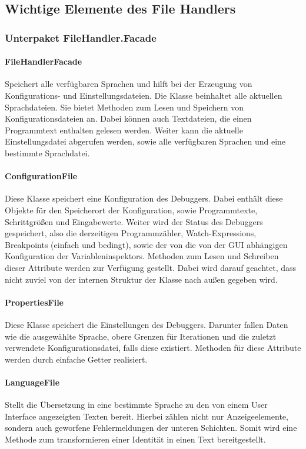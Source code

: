 \documentclass[parskip=full]{scrartcl}
\begin{document}
\subsection{Wichtige Elemente des File Handlers}
\subsubsection{Unterpaket FileHandler.Facade}
\paragraph{FileHandlerFacade}
Speichert alle verfügbaren Sprachen und hilft bei der Erzeugung von Konfigurations- und Einstellungsdateien.
Die Klasse beinhaltet alle aktuellen Sprachdateien.
Sie bietet Methoden zum Lesen und Speichern von Konfigurationsdateien an. Dabei können auch Textdateien, die einen Programmtext enthalten gelesen werden.
Weiter kann die aktuelle Einstellungsdatei abgerufen werden, sowie alle verfügbaren Sprachen und eine bestimmte Sprachdatei.
\paragraph{ConfigurationFile}
Diese Klasse speichert eine Konfiguration des Debuggers.
Dabei enthält diese Objekte für den Speicherort der Konfiguration, sowie Programmtexte, Schrittgrößen und Eingabewerte.
Weiter wird der Status des Debuggers gespeichert, also die derzeitigen Programmzähler, Watch-Expressions, Breakpoints (einfach und bedingt), sowie der von die von der GUI abhängigen Konfiguration der Variableninspektors.
Methoden zum Lesen und Schreiben dieser Attribute werden zur Verfügung gestellt. Dabei wird darauf geachtet, dass nicht zuviel von der internen Struktur der Klasse nach außen gegeben wird.
\paragraph{PropertiesFile}
Diese Klasse speichert die Einstellungen des Debuggers.
Darunter fallen Daten wie die ausgewählte Sprache, obere Grenzen für Iterationen und die zuletzt verwendete Konfigurationsdatei, falls diese existiert.
Methoden für diese Attribute werden durch einfache Getter realisiert.
\paragraph{LanguageFile}
Stellt die Übersetzung in eine bestimmte Sprache zu den von einem User Interface angezeigten Texten bereit.
Hierbei zählen nicht nur Anzeigeelemente, sondern auch geworfene Fehlermeldungen der unteren Schichten.
Somit wird eine Methode zum transformieren einer Identität in einen Text bereitgestellt.
\end{document}

